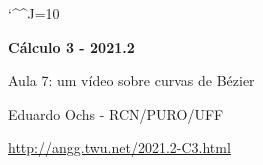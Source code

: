 \documentclass[oneside,12pt]{article}
\begin{document}
\catcode`\^^J=10

\pu

\pu


\def\drafturl{http://angg.twu.net/LATEX/2021-2-C3.pdf}
\def\drafturl{http://angg.twu.net/2021.2-C3.html}
\def\draftfooter{\tiny \href{\drafturl}{\jobname{}} \ColorBrown{\shorttoday{} \hours}}



%

\thispagestyle{empty}

\begin{center}

\vspace*{1.2cm}

{\bf \Large Cálculo 3 - 2021.2}

\bsk

Aula 7: um vídeo sobre curvas de Bézier

\bsk

Eduardo Ochs - RCN/PURO/UFF

\url{http://angg.twu.net/2021.2-C3.html}

\end{center}

\newpage

%                             
\end{document}
